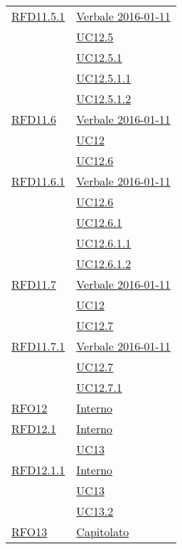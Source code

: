 \begin{longtable}{|>{\centering}m{5cm}|m{5cm}<{\centering}|}
\hyperlink{RFD11.5.1}{RFD11.5.1} & \hyperlink{Verbale 2016-01-11}{Verbale 2016-01-11}\\
& \hyperref[UC12.5]{UC12.5}\\
& \hyperref[UC12.5.1]{UC12.5.1}\\
& \hyperref[UC12.5.1.1]{UC12.5.1.1}\\
& \hyperref[UC12.5.1.2]{UC12.5.1.2}\\ \hline

\hyperlink{RFD11.6}{RFD11.6} & \hyperlink{Verbale 2016-01-11}{Verbale 2016-01-11}\\
& \hyperref[UC12]{UC12}\\
& \hyperref[UC12.6]{UC12.6}\\ \hline

\hyperlink{RFD11.6.1}{RFD11.6.1} & \hyperlink{Verbale 2016-01-11}{Verbale 2016-01-11}\\
& \hyperref[UC12.6]{UC12.6}\\
& \hyperref[UC12.6.1]{UC12.6.1}\\
& \hyperref[UC12.6.1.1]{UC12.6.1.1}\\
& \hyperref[UC12.6.1.2]{UC12.6.1.2}\\ \hline

\hyperlink{RFD11.7}{RFD11.7} & \hyperlink{Verbale 2016-01-11}{Verbale 2016-01-11}\\
& \hyperref[UC12]{UC12}\\
& \hyperref[UC12.7]{UC12.7}\\ \hline

\hyperlink{RFD11.7.1}{RFD11.7.1} & \hyperlink{Verbale 2016-01-11}{Verbale 2016-01-11}\\
& \hyperref[UC12.7]{UC12.7}\\
& \hyperref[UC12.7.1]{UC12.7.1}\\ \hline

\hyperlink{RFO12}{RFO12} & \hyperlink{Interno}{Interno}\\ \hline

\hyperlink{RFD12.1}{RFD12.1} & \hyperlink{Interno}{Interno}\\
& \hyperref[UC13]{UC13}\\ \hline

\hyperlink{RFD12.1.1}{RFD12.1.1} & \hyperlink{Interno}{Interno}\\
& \hyperref[UC13]{UC13}\\
& \hyperref[UC13.2]{UC13.2}\\ \hline

\hyperlink{RFO13}{RFO13} & \hyperlink{Capitolato}{Capitolato}\\ \hline


\end{longtable}
